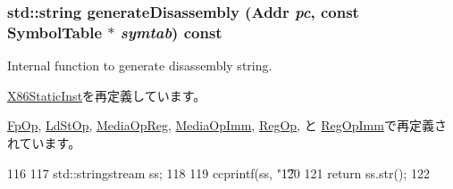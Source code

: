 \hypertarget{classX86ISA_1_1X86MicroopBase_a95d323a22a5f07e14d6b4c9385a91896}{
\subsubsection[{generateDisassembly}]{\setlength{\rightskip}{0pt plus 5cm}std::string generateDisassembly ({\bf Addr} {\em pc}, \/  const {\bf SymbolTable} $\ast$ {\em symtab}) const}}
\label{classX86ISA_1_1X86MicroopBase_a95d323a22a5f07e14d6b4c9385a91896}
Internal function to generate disassembly string. 

\hyperlink{classX86ISA_1_1X86StaticInst_a95d323a22a5f07e14d6b4c9385a91896}{X86StaticInst}を再定義しています。

\hyperlink{classX86ISA_1_1FpOp_a95d323a22a5f07e14d6b4c9385a91896}{FpOp}, \hyperlink{classX86ISA_1_1LdStOp_a95d323a22a5f07e14d6b4c9385a91896}{LdStOp}, \hyperlink{classX86ISA_1_1MediaOpReg_a95d323a22a5f07e14d6b4c9385a91896}{MediaOpReg}, \hyperlink{classX86ISA_1_1MediaOpImm_a95d323a22a5f07e14d6b4c9385a91896}{MediaOpImm}, \hyperlink{classX86ISA_1_1RegOp_a95d323a22a5f07e14d6b4c9385a91896}{RegOp}, と \hyperlink{classX86ISA_1_1RegOpImm_a95d323a22a5f07e14d6b4c9385a91896}{RegOpImm}で再定義されています。


\begin{DoxyCode}
116         {
117             std::stringstream ss;
118 
119             ccprintf(ss, "\t%
120 
121             return ss.str();
122         }
\end{DoxyCode}


